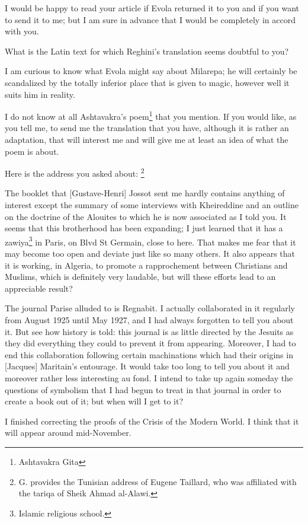 I would be happy to read your article if Evola returned it to you and if you want to send it to me; but I am sure in advance that I would be completely in accord with you.

What is the Latin text for which Reghini's translation seems doubtful to you?

I am curious to know what Evola might say about Milarepa; he will certainly be scandalized by the totally inferior place that is given to magic, however well it suits him in reality.

I do not know at all Ashtavakra's poem\footnote{Ashtavakra Gita} that you mention. If you would like, as you tell me, to send me the translation that you have, although it is rather an adaptation, that will interest me and will give me at least an idea of what the poem is about.

Here is the address you asked about: \footnote{G. provides the Tunisian address of Eugene Taillard, who was affiliated with the tariqa of Sheik Ahmad al-Alawi.}

The booklet that [Gustave-Henri] Jossot sent me hardly contains anything of interest except the summary of some interviews with Kheireddine and an outline on the doctrine of the Alouites to which he is now associated as I told you. It seems that this brotherhood has been expanding; I just learned that it has a zawiya\footnote{Islamic religious school.} in Paris, on Blvd St Germain, close to here. That makes me fear that it may become too open and deviate just like so many others. It also appears that it is working, in Algeria, to promote a rapprochement between Christians and Muslims, which is definitely very laudable, but will these efforts lead to an appreciable result?

The journal Parise alluded to is Regnabit. I actually collaborated in it regularly from August 1925 until May 1927, and I had always forgotten to tell you about it. But see how history is told: this journal is as little directed by the Jesuits as they did everything they could to prevent it from appearing. Moreover, I had to end this collaboration following certain machinations which had their origins in [Jacques] Maritain's entourage. It would take too long to tell you about it and moreover rather less interesting au fond. I intend to take up again someday the questions of symbolism that I had begun to treat in that journal in order to create a book out of it; but when will I get to it?

I finished correcting the proofs of the Crisis of the Modern World. I think that it will appear around mid-November.



